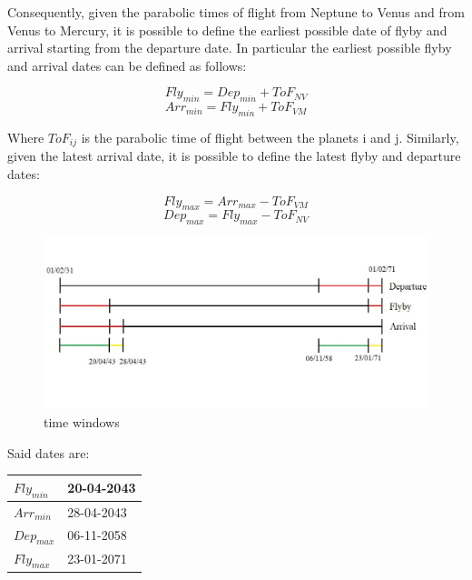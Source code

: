 \documentclass[11pt,a4paper]{report}
\begin{document}
Consequently, given the parabolic times of flight from Neptune to Venus and from Venus to Mercury, it is possible to define the earliest possible date of flyby and arrival starting from the departure date. In particular the earliest possible flyby  and arrival dates can be defined as follows:

\begin{equation*}
    Fly_{min}=Dep_{min}+ ToF_{NV}
\end{equation*}
\begin{equation*}
    Arr_{min}=Fly_{min} + ToF_{VM}
\end{equation*}

Where $ToF_{ij}$ is the parabolic time of flight between the planets i and j.
Similarly, given the latest arrival date, it is possible to define the latest flyby and departure dates:

\begin{equation*}
    Fly_{max}=Arr_{max}- ToF_{VM}
\end{equation*}
\begin{equation*}
    Dep_{max}=Fly_{max} - ToF_{NV}
\end{equation*}

\begin{figure}[H]
\centering
\includegraphics[width = \textwidth]{time_windows.jpg}
\caption{time windows}
\end{figure}

Said dates are:

\begin{table}[H]
\centering
\begin{tabular}{|l|l|}
\hline
$Fly_{min}$ & 20-04-2043 \\ \hline
$Arr_{min}$ & 28-04-2043 \\ \hline
$Dep_{max}$ & 06-11-2058 \\ \hline
$Fly_{max}$ & 23-01-2071 \\ \hline
\end{tabular}
\end{table}
\end{document}
